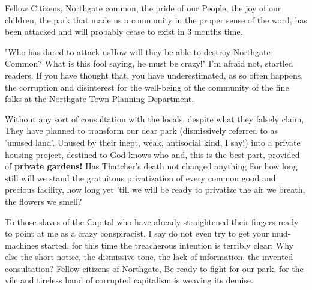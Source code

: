 \documentclass{article}
\date{\today}
\begin{document}
\maketitle
\begin{multicols}{3}
Fellow Citizens, Northgate common, the pride of our People, the joy of our
children, the park that made us a community in the proper sense of the word, has
been attacked and will probably cease to exist in 3 months time.

"Who has dared to attack us\textinterrobang  How will they be able to destroy Northgate Common? What is this fool saying, he must be crazy!"
I'm afraid not, startled readers. If you have thought that, you have underestimated, as so often happens, the corruption
and disinterest for the well-being of the community of the fine folks at the Northgate Town Planning Department.

Without any sort of consultation with the locals, despite what they falsely claim, They have planned to transform our dear park
(dismissively referred to as 'unused land'. Unused by their inept, weak, antisocial kind, I say!) into a private housing project, 
destined to God-knows-who and, this is the best part, provided of \textbf{private gardens!} Has Thatcher's death not changed anything\textinterrobang 
For how long still will we stand the gratuitous privatization of every common good and precious facility, how long yet 'till we will be ready to privatize
the air we breath, the flowers we smell?

To those slaves of the Capital who have already straightened their fingers ready to point at me as a crazy conspiracist, 
I say do not even try to get your mud-machines started, for this time the treacherous intention is terribly clear;
Why else the short notice, the dismissive tone, the lack of information, the invented consultation?
Fellow citizens of Northgate,
Be ready to fight for our park, for the vile and tireless hand of corrupted capitalism is weaving its demise.
\closearticle
\end{multicols}
\end{document}
